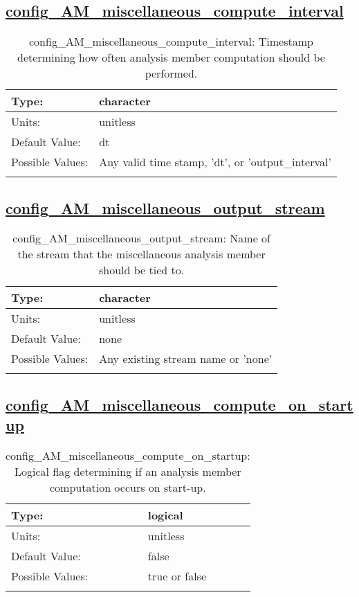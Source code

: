 \subsection[config\_AM\_miscellaneous\_compute\_interval]{\hyperref[sec:nm_tab_AM_miscellaneous]{config\_AM\_miscellaneous\_compute\_interval}}
\label{subsec:nm_sec_config_AM_miscellaneous_compute_interval}
\begin{center}
\begin{longtable}{| p{2.0in} || p{4.0in} |}
    \hline
    Type: & character \\
    \hline
    Units: & \si{unitless} \\
    \hline
    Default Value: & dt \\
    \hline
    Possible Values: & Any valid time stamp, 'dt', or 'output\_interval' \\
    \hline
    \caption{config\_AM\_miscellaneous\_compute\_interval: Timestamp determining how often analysis member computation should be performed.}
\end{longtable}
\end{center}
\subsection[config\_AM\_miscellaneous\_output\_stream]{\hyperref[sec:nm_tab_AM_miscellaneous]{config\_AM\_miscellaneous\_output\_stream}}
\label{subsec:nm_sec_config_AM_miscellaneous_output_stream}
\begin{center}
\begin{longtable}{| p{2.0in} || p{4.0in} |}
    \hline
    Type: & character \\
    \hline
    Units: & \si{unitless} \\
    \hline
    Default Value: & none \\
    \hline
    Possible Values: & Any existing stream name or 'none' \\
    \hline
    \caption{config\_AM\_miscellaneous\_output\_stream: Name of the stream that the miscellaneous analysis member should be tied to.}
\end{longtable}
\end{center}
\subsection[config\_AM\_miscellaneous\_compute\_on\_startup]{\hyperref[sec:nm_tab_AM_miscellaneous]{config\_AM\_miscellaneous\_compute\_on\_startup}}
\label{subsec:nm_sec_config_AM_miscellaneous_compute_on_startup}
\begin{center}
\begin{longtable}{| p{2.0in} || p{4.0in} |}
    \hline
    Type: & logical \\
    \hline
    Units: & \si{unitless} \\
    \hline
    Default Value: & false \\
    \hline
    Possible Values: & true or false \\
    \hline
    \caption{config\_AM\_miscellaneous\_compute\_on\_startup: Logical flag determining if an analysis member computation occurs on start-up.}
\end{longtable}
\end{center}

